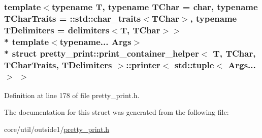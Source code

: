 \subsubsection*{template$<$typename T, typename T\+Char = char, typename T\+Char\+Traits = \+::std\+::char\+\_\+traits$<$\+T\+Char$>$, typename T\+Delimiters = delimiters$<$\+T, T\+Char$>$$>$\\*
template$<$typename... Args$>$\\*
struct pretty\+\_\+print\+::print\+\_\+container\+\_\+helper$<$ T, T\+Char, T\+Char\+Traits, T\+Delimiters $>$\+::printer$<$ std\+::tuple$<$ Args... $>$ $>$}



Definition at line 178 of file pretty\+\_\+print.\+h.



The documentation for this struct was generated from the following file\+:\begin{DoxyCompactItemize}
\item 
core/util/outside1/\hyperlink{pretty__print_8h}{pretty\+\_\+print.\+h}\end{DoxyCompactItemize}
